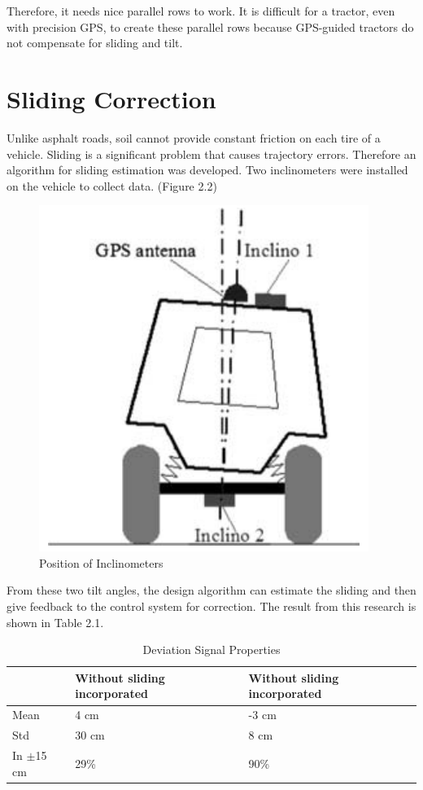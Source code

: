 Therefore, it needs nice parallel rows to work. It is difficult for a tractor, even with precision GPS, to create these parallel rows because GPS-guided tractors do not compensate for sliding and tilt.

\section{Sliding Correction}
Unlike asphalt roads, soil cannot provide constant friction on each tire of a vehicle. Sliding is a significant problem that causes trajectory errors. Therefore an algorithm for sliding estimation was developed. Two inclinometers were installed on the vehicle to collect data. (Figure 2.2) 
\begin{figure}[ht!]
\begin{center}
\includegraphics[scale = 0.4]{pics/slidingcorrection.png}
\caption{Position of Inclinometers}
\end{center}
\end{figure}
From these two tilt angles, the design algorithm can estimate the sliding and then give feedback to the control system for correction. The result from this research is shown in Table 2.1. \cite{lenain2006high}
\begin{table}[ht!]
\caption{Deviation Signal Properties}
\begin{center}	
\begin{tabular}{|l|l|l|}
\hline
 & Without sliding incorporated & Without sliding incorporated \\ 
\hline
Mean & 4 cm & -3 cm \\
\hline
Std &  30 cm & 8 cm\\
\hline
In $\pm$15 cm & 29\% & 90\%\\
\hline

\end{tabular}
\end{center}					
\end{table}